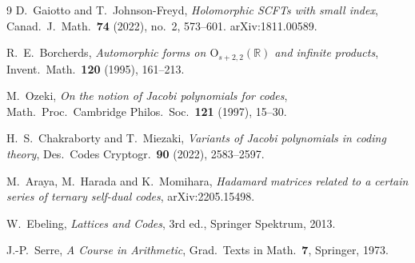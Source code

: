 \documentclass[11pt]{amsart}
\theoremstyle{definition}
\begin{document}
\begin{thebibliography}{9}
D.~Gaiotto and T.~Johnson-Freyd,
\emph{Holomorphic SCFTs with small index},
Canad.\ J.\ Math.\ \textbf{74} (2022), no.~2, 573--601. arXiv:1811.00589.

R.~E.~Borcherds,
\emph{Automorphic forms on $\mathrm{O}_{s+2,2}(\mathbb R)$ and infinite products},
Invent.\ Math.\ \textbf{120} (1995), 161--213.

M.~Ozeki,
\emph{On the notion of Jacobi polynomials for codes},
Math.\ Proc.\ Cambridge Philos.\ Soc.\ \textbf{121} (1997), 15--30.

H.~S.~Chakraborty and T.~Miezaki,
\emph{Variants of Jacobi polynomials in coding theory},
Des.\ Codes Cryptogr.\ \textbf{90} (2022), 2583--2597.

M.~Araya, M.~Harada and K.~Momihara,
\emph{Hadamard matrices related to a certain series of ternary self-dual codes},
arXiv:2205.15498.

W.~Ebeling,
\emph{Lattices and Codes}, 3rd ed., Springer Spektrum, 2013.

J.-P.~Serre,
\emph{A Course in Arithmetic}, Grad.\ Texts in Math.\ \textbf{7}, Springer, 1973.
\end{thebibliography}
\end{document}
